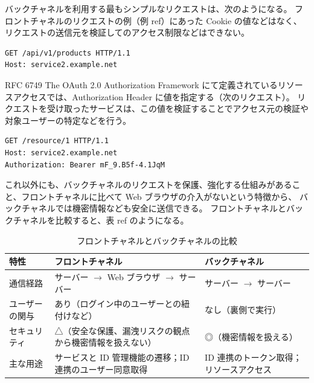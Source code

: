 \documentclass[uplatex]{jsarticle}
\def\ref#1{ref}%
\def\label#1{}%
\begin{document}
\begin{exa}[バックチャネルの最もシンプルなリクエスト]\label{exa:ch6-back-channel-simple}
バックチャネルを利用する最もシンプルなリクエストは、次のようになる。
フロントチャネルのリクエストの例（例 \ref{exa:ch6-front-channel}）にあった Cookie の値などはなく、
リクエストの送信元を検証してのアクセス制限などはできない。
\end{exa}

\begin{verbatim}
GET /api/v1/products HTTP/1.1
Host: service2.example.net
\end{verbatim}

\begin{exa}\label{exa:ch6-back-channel-bearer}
RFC 6749 The OAuth 2.0 Authorization Framework にて定義されているリソースアクセスでは、Authorization Header に値を指定する（次のリクエスト）。
リクエストを受け取ったサービスは、この値を検証することでアクセス元の検証や対象ユーザーの特定などを行う。
\end{exa}

\begin{verbatim}
GET /resource/1 HTTP/1.1
Host: service2.example.net
Authorization: Bearer mF_9.B5f-4.1JqM
\end{verbatim}

これ以外にも、バックチャネルのリクエストを保護、強化する仕組みがあること、フロントチャネルに比べて Web ブラウザの介入がないという特徴から、
バックチャネルでは機密情報なども安全に送信できる。
フロントチャネルとバックチャネルを比較すると、表 \ref{tab:ch6-channels} のようになる。

\begin{table}[H]
\centering
\caption{フロントチャネルとバックチャネルの比較}\label{tab:ch6-channels}
\begin{tabular}{|p{20mm}|p{58mm}|p{48mm}|}
\hline
特性 & フロントチャネル & バックチャネル \\ \hline
通信経路 & サーバー $\to$ Web ブラウザ $\to$ サーバー & サーバー $\to$ サーバー \\ \hline
ユーザーの関与 & あり（ログイン中のユーザーとの紐付けなど） & なし（裏側で実行） \\ \hline
セキュリティ & △（安全な保護、漏洩リスクの観点から機密情報を扱えない） & ◎（機密情報を扱える） \\ \hline
主な用途 & サービスと ID 管理機能の遷移；ID 連携のユーザー同意取得 & ID 連携のトークン取得；リソースアクセス \\ \hline
\end{tabular}
\end{table}
\end{document}
